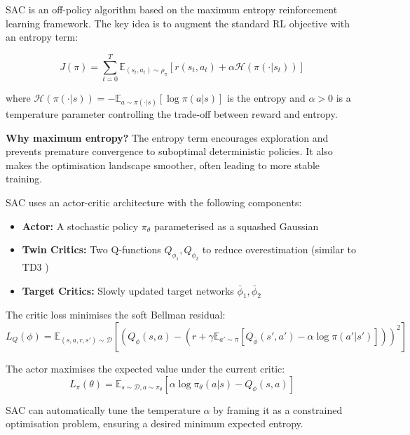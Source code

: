 \documentclass[12pt,a4paper]{report}
\begin{document}
SAC \cite{haarnoja2018sac} is an off-policy algorithm based on the maximum entropy reinforcement learning framework. The key idea is to augment the standard RL objective with an entropy term:

\begin{equation}
J(\pi) = \sum_{t=0}^{T} \mathbb{E}_{(s_t,a_t)\sim\rho_\pi} \left[ r(s_t, a_t) + \alpha \mathcal{H}(\pi(\cdot|s_t)) \right]
\end{equation}

where $\mathcal{H}(\pi(\cdot|s)) = -\mathbb{E}_{a \sim \pi(\cdot|s)}[\log \pi(a|s)]$ is the entropy and $\alpha > 0$ is a temperature parameter controlling the trade-off between reward and entropy.

\textbf{Why maximum entropy?} The entropy term encourages exploration and prevents premature convergence to suboptimal deterministic policies. It also makes the optimisation landscape smoother, often leading to more stable training.

SAC uses an actor-critic architecture with the following components:

\begin{itemize}
    \item \textbf{Actor:} A stochastic policy $\pi_\theta$ parameterised as a squashed Gaussian
    \item \textbf{Twin Critics:} Two Q-functions $Q_{\phi_1}, Q_{\phi_2}$ to reduce overestimation (similar to TD3 \cite{fujimoto2018addressing})
    \item \textbf{Target Critics:} Slowly updated target networks $\bar{\phi}_1, \bar{\phi}_2$
\end{itemize}

The critic loss minimises the soft Bellman residual:
\begin{equation}
L_Q(\phi) = \mathbb{E}_{(s,a,r,s') \sim \mathcal{D}} \left[ \left( Q_\phi(s,a) - \left(r + \gamma \mathbb{E}_{a' \sim \pi}[Q_{\bar{\phi}}(s',a') - \alpha \log \pi(a'|s')] \right) \right)^2 \right]
\end{equation}

The actor maximises the expected value under the current critic:
\begin{equation}
L_\pi(\theta) = \mathbb{E}_{s \sim \mathcal{D}, a \sim \pi_\theta} \left[ \alpha \log \pi_\theta(a|s) - Q_\phi(s,a) \right]
\end{equation}

SAC can automatically tune the temperature $\alpha$ by framing it as a constrained optimisation problem, ensuring a desired minimum expected entropy.
\end{document}
